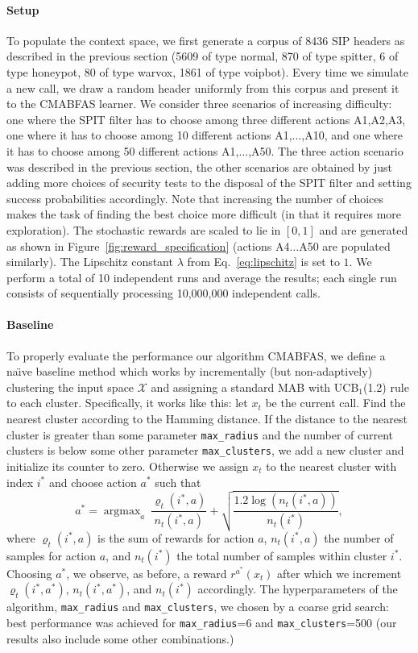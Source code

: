 \documentclass{llncs}
\newcommand{\argmax}{\mathop{\mathrm{argmax}}}
\begin{document}
\paragraph{Setup}
To populate the context space, we first generate a corpus of 8436 SIP headers as described
in the previous section (5609 of type normal, 870 of type spitter, 6 of type honeypot, 80 of type 
warvox, 1861 of type voipbot). Every time we simulate a new call, we draw a random header uniformly 
from this corpus and present it to the CMABFAS learner. 
We consider three scenarios of increasing difficulty: one where the SPIT filter has to choose among
three different actions A1,A2,A3, one where it has to choose among 10 different actions A1,$\ldots$,A10,
and one where it has to choose among 50 different actions A1,$\ldots$,A50. The three action scenario
was described in the previous section, the other scenarios are obtained by just adding more choices of
security tests to the disposal of the SPIT filter and setting success probabilities accordingly. Note
that increasing the number of choices makes the task of finding the best choice more difficult (in
that it requires more exploration).
The stochastic rewards are scaled to lie in 
$[0,1]$ and are generated as shown in Figure~\ref{fig:reward_specification} (actions A4$\ldots$A50 are populated similarly). 
The Lipschitz constant $\lambda$ from Eq.~\eqref{eq:lipschitz} is set to $1$. We perform a total of 10 independent runs and 
average the results; each single run consists of sequentially processing 10,000,000 independent calls. 


\paragraph{Baseline}
To properly evaluate the performance our algorithm CMABFAS, we define a na\"{\i}ve baseline method
which works by incrementally (but non-adaptively) clustering the input space $\mathcal X$
and assigning a standard MAB with UCB$_1$(1.2) rule \cite{UCB1.2} to each cluster. Specifically,
it works like this: let $x_t$ be the current call. Find the nearest cluster according to the Hamming distance.
If the distance to the nearest cluster is greater than some parameter {\tt max\_radius} and the 
number of current clusters is below some other parameter {\tt max\_clusters}, we add a new
cluster and initialize its counter to zero. Otherwise we assign $x_t$ to the nearest cluster 
with index $i^*$ and choose action $a^*$ such that
\[
a^*=\argmax_a \ \frac{\varrho_t(i^*,a)}{n_t(i^*,a)} + \sqrt{\frac{1.2\log(n_t(i^*,a))}{n_t(i^*)}},
\]
where $\varrho_t(i^*,a)$ is the sum of rewards for action $a$, $n_t(i^*,a)$ the number of samples
for action $a$, and $n_t(i^*)$ the total number of samples within cluster $i^*$. Choosing $a^*$, we 
observe, as before, a reward $r^{a^*}(x_t)$ after which we increment $\varrho_t(i^*,a^*)$, $n_t(i^*,a^*)$,
and $n_t(i^*)$ accordingly. The hyperparameters of the algorithm, {\tt max\_radius} and {\tt max\_clusters},
we chosen by a coarse grid search: best performance was achieved for {\tt max\_radius}=6 and 
{\tt max\_clusters}=500 (our results also include some other combinations.)   
\end{document}
